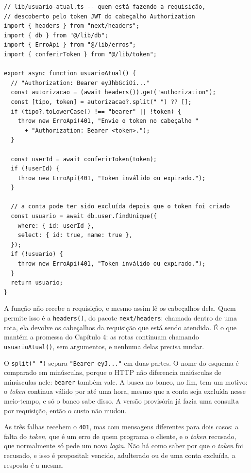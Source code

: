 \begin{codigo}
\begin{Verbatim}[breaklines=true, breaksymbolleft={}, fontsize=\footnotesize]
// lib/usuario-atual.ts -- quem está fazendo a requisição,
// descoberto pelo token JWT do cabeçalho Authorization
import { headers } from "next/headers";
import { db } from "@/lib/db";
import { ErroApi } from "@/lib/erros";
import { conferirToken } from "@/lib/token";

export async function usuarioAtual() {
  // "Authorization: Bearer eyJhbGciOi..."
  const autorizacao = (await headers()).get("authorization");
  const [tipo, token] = autorizacao?.split(" ") ?? [];
  if (tipo?.toLowerCase() !== "bearer" || !token) {
    throw new ErroApi(401, "Envie o token no cabeçalho "
      + "Authorization: Bearer <token>.");
  }

  const userId = await conferirToken(token);
  if (!userId) {
    throw new ErroApi(401, "Token inválido ou expirado.");
  }

  // a conta pode ter sido excluída depois que o token foi criado
  const usuario = await db.user.findUnique({
    where: { id: userId },
    select: { id: true, name: true },
  });
  if (!usuario) {
    throw new ErroApi(401, "Token inválido ou expirado.");
  }
  return usuario;
}
\end{Verbatim}
\end{codigo}

A função não recebe a requisição, e mesmo assim lê os cabeçalhos dela. Quem permite isso é a \texttt{headers()}, do pacote \texttt{next/headers}: chamada dentro de uma rota, ela devolve os cabeçalhos da requisição que está sendo atendida. É o que mantém a promessa do Capítulo 4: as rotas continuam chamando \texttt{usuarioAtual()}, sem argumentos, e nenhuma delas precisa mudar.

O \texttt{split(" ")} separa \texttt{"Bearer eyJ..."} em duas partes. O nome do esquema é comparado em minúsculas, porque o HTTP não diferencia maiúsculas de minúsculas nele: \texttt{bearer} também vale. A busca no banco, no fim, tem um motivo: o \textit{token} continua válido por até uma hora, mesmo que a conta seja excluída nesse meio-tempo, e só o banco sabe disso. A versão provisória já fazia uma consulta por requisição, então o custo não mudou.

As três falhas recebem o \texttt{401}, mas com mensagens diferentes para dois casos: a falta do \textit{token}, que é um erro de quem programa o cliente, e o \textit{token} recusado, que normalmente só pede um novo \textit{login}. Não há como saber por que o \textit{token} foi recusado, e isso é proposital: vencido, adulterado ou de uma conta excluída, a resposta é a mesma.

